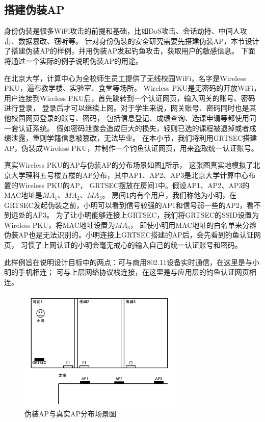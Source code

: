     \subsection{搭建伪装AP}\label{subsec:demo_fake_wifi}

    身份伪装是很多WiFi攻击的前提和基础，比如DoS攻击、会话劫持、中间人攻击、数据篡改、窃听等\cite{ieeewc10noncryp}。
    针对身份伪装的安全研究需要先搭建伪装AP，本节设计了搭建伪装AP的样例，并用伪装AP发起钓鱼攻击，获取用户的敏感信息。
    下面将通过一个实际的例子说明伪装AP的用途。

		在北京大学，计算中心为全校师生员工提供了无线校园WiFi，名字是Wireless PKU，遍布教学楼、实验室、食堂等场所。
		Wireless PKU是无密码的开放WiFi，用户连接到Wireless PKU后，首先跳转到一个认证网页，输入网关的账号、密码进行登录，
		登录后才可以继续上网。对于学生来说，网关账号、密码同时也是其他校园网页登录的账号、密码，
		包括信息登记、成绩查询、选课申请等都使用同一套认证系统。
		假如密码泄露会造成巨大的损失，轻则已选的课程被退掉或者成绩泄露，重则学籍信息被篡改，无法毕业。
		在本小节，我们将利用GRTSEC搭建AP，伪装成Wireless PKU，并制作一个钓鱼认证网页，用来盗取统一认证账号。

		真实Wireless PKU的AP与伪装AP的分布场景如图\ref{fig:demo_fake_wifi_scenary}所示，
		这张图真实地模拟了北京大学理科五号楼五楼的AP分布，其中AP1、AP2、AP3是北京大学计算中心布置的Wireless PKU的AP，
		GRTSEC摆放在房间1中。假设AP1、AP2、AP3的MAC地址是$MA_1$、$MA_2$、$MA_3$。
		房间1内有个用户，我们称他为小明，在GRTSEC发起伪装之前，小明可以看到信号较强的AP1和信号弱一些的AP2，看不到远处的AP3。
		为了让小明能够连接上GRTSEC，我们将GRTSEC的SSID设置为Wireless PKU，将MAC地址设置为$MA_3$，
		即使小明用MAC地址的白名单来分辨伪装AP也是无法识别的。小明连接上GRTSEC搭建的AP后，会先看到钓鱼认证网页，
		习惯了上网认证的小明会毫无戒心的输入自己的统一认证账号和密码。

		此样例旨在说明设计目标中的两点：可与商用802.11设备实时通信，在这里是与小明的手机相连；
		可与上层网络协议栈连接，在这里是与应用层的钓鱼认证网页相连。

			\begin{figure}
				\centering
				\includegraphics[width=0.7\textwidth]{img/demo_fake_wifi_scenary.png}
				\caption{伪装AP与真实AP分布场景图}
				\label{fig:demo_fake_wifi_scenary}
			\end{figure}

